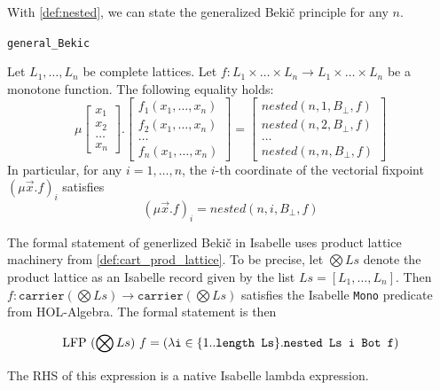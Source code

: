 With \autoref{def:nested}, we can state the generalized Beki\v{c} principle for any $n$.

\begin{btheorem}
\label{thm:general_bekic}

\texttt{general\_Bekic}

    Let $L_1,\dots,L_n$ be complete lattices. Let $f:L_1\times \dots\times L_n \rightarrow L_1\times \dots\times L_n$ be a monotone function. The following equality holds:
    \begin{equation}
        \label{eqn:general_Bekic}
        \mu \begin{bmatrix}
        x_1 \\ x_2 \\ \dots \\ x_n
    \end{bmatrix}. \begin{bmatrix}
        f_1(x_1,\dots,x_n) \\ f_2(x_1,\dots,x_n) \\ \dots \\ f_n(x_1,\dots,x_n)
    \end{bmatrix} = \begin{bmatrix}
        nested(n,1,B_\bot,f) \\ nested(n,2,B_\bot,f) \\ \dots \\ nested(n,n,B_\bot,f)
    \end{bmatrix}
    \end{equation}
    In particular, for any $i=1,\dots,n$, the $i$-th coordinate of the vectorial fixpoint $(\mu\vec{x}. f)_i$ satisfies
    \begin{equation}
        \label{eqn:general_Bekic_coord}
        (\mu\vec{x}. f)_i = nested (n,i,B_\bot,f)
    \end{equation}
\end{btheorem}

\medskip

\begin{remark}
The formal statement of generlized Beki\v{c} in Isabelle uses product lattice machinery from \autoref{def:cart_prod_lattice}. To be precise, let $\bigotimes Ls$ denote the product lattice as an Isabelle record given by the list $Ls = [L_1,\dots,L_n]$. Then $f: \texttt{carrier}(\bigotimes Ls) \rightarrow \texttt{carrier}(\bigotimes Ls)$ satisfies the Isabelle \texttt{Mono} predicate from HOL-Algebra. The formal statement is then

\[\operatorname{LFP}\ (\bigotimes Ls)\ f = (\lambda \texttt{i}\in\{1..\texttt{length Ls}\}. \texttt{nested Ls i Bot f})\]

The RHS of this expression is a native Isabelle lambda expression.
\end{remark}


